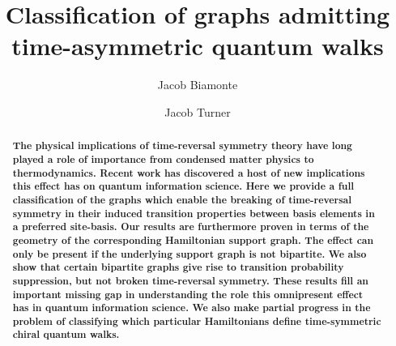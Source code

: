 \documentclass[twocolumn,superscriptaddress]{revtex4-1}
\theoremstyle{plain}
\theoremstyle{definition}
\theoremstyle{definition}
\theoremstyle{definition}
\theoremstyle{definition}
\theoremstyle{definition}
\theoremstyle{definition}
\begin{document}
\title{Classification of graphs admitting time-asymmetric quantum walks}
 \author{Jacob Biamonte}  

\author{Jacob Turner} 
\begin{abstract}
{\bf The physical implications of time-reversal symmetry theory have long played a role of importance from condensed matter physics
to thermodynamics. Recent work has discovered a host of new implications this effect has on quantum information science. 
Here we provide a full classification of the graphs which enable the breaking of time-reversal symmetry in their induced transition properties between basis elements in a preferred site-basis.  Our results are furthermore proven in terms of the geometry of the corresponding Hamiltonian support graph. The effect can only be present if the underlying support graph is not bipartite. We also show that certain bipartite graphs give rise to transition probability suppression, but not broken time-reversal symmetry. These results fill an important missing gap in understanding the role this omnipresent effect has in quantum information science. We also make partial progress in the problem of classifying which particular Hamiltonians define time-symmetric chiral quantum walks.}  
\end{abstract}
\end{document}
